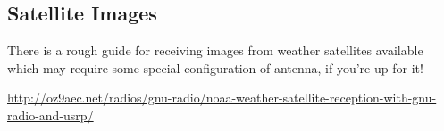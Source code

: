 \documentclass[titlepage,a4paper]{article}
\begin{document}
\subsection{Satellite Images}
There is a rough guide for receiving images from weather satellites available which may require some special configuration of antenna, if you're up for it! 

\url{http://oz9aec.net/radios/gnu-radio/noaa-weather-satellite-reception-with-gnu-radio-and-usrp/}

\newpage
\printglossary
\end{document}

